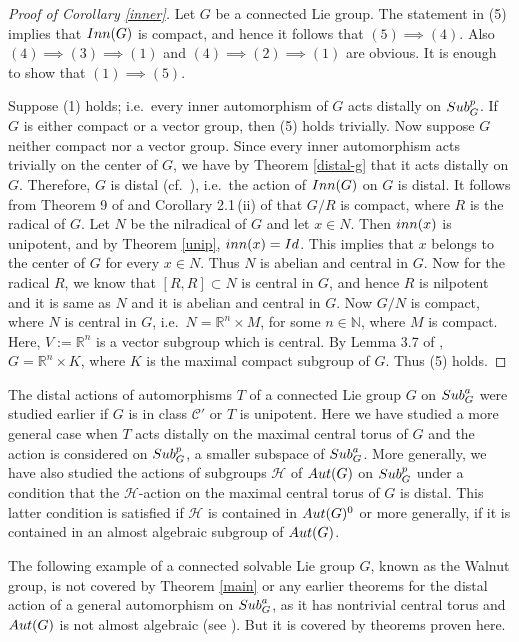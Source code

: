 \documentclass{amsart}
\numberwithin{equation}{section}
\newcommand{\Aut}{{\rm Aut}}
\newcommand{\Sub}{{\rm Sub}}
\newcommand{\N}{{\mathbb N}}
\newcommand{\R}{{\mathbb R}}
\newcommand{\Hc}{{\mathcal H}}
\newcommand{\spg}{{\rm Sub}^p_G}
\newcommand{\Id}{{\rm Id}}
\newcommand{\Inn}{{\rm Inn}}
\newcommand{\inn}{{\rm inn}}
\theoremstyle{remark}
\newcommand{\cp}{{\mathcal{C}'}}
\begin{document}
\begin{proof}[Proof of Corollary \ref{inner}] Let $G$ be a connected Lie group. The statement 
in (5) implies that $\Inn(G)$ is compact, and hence it follows that $(5)\implies (4)$. 
Also $(4)\implies (3)\implies (1)$ and $(4)\implies (2)\implies (1)$ are obvious. 
It is enough to show that $(1)\implies (5)$. 

Suppose (1) holds; i.e.\ every inner automorphism of $G$ acts distally on $\spg$. If $G$ is either compact 
or a vector group, then (5) holds trivially. Now suppose $G$ neither compact nor a vector group. 
Since every inner automorphism acts trivially on the center of $G$, we have by Theorem \ref{distal-g} that 
it acts distally on $G$. Therefore, $G$ is distal (cf.\ \cite{Ro}), i.e.\ the action of $\Inn(G)$ on $G$ is distal. 
It follows from Theorem 9 of \cite{Ro} and Corollary 2.1\,(ii) of \cite{Je} that $G/R$ is compact, where $R$ 
is the radical of $G$. Let $N$ be the nilradical of $G$ and let $x\in N$. Then $\inn(x)$ is unipotent, and 
by Theorem \ref{unip}, $\inn(x)=\Id$. This implies that $x$ belongs to the center of $G$ for every $x\in N$. Thus 
$N$ is abelian and central in $G$. Now for the radical $R$, we know that $[R,R]\subset N$ is central in $G$, 
and hence $R$ is nilpotent and it is same as $N$ and it is abelian and central in $G$. Now $G/N$ is compact,  
where $N$ is central in $G$, i.e.\ $N=\R^n\times M$, for some $n\in\N$, where $M$ is compact. Here, 
$V:=\R^n$ is a vector subgroup which is central. By Lemma 3.7 of \cite{I}, $G=\R^n\times K$, where $K$ 
is the maximal compact subgroup of $G$. Thus (5) holds.
\end{proof}

The distal actions of automorphisms $T$ of a connected Lie group $G$ on $\Sub^a_G$ were studied 
earlier if $G$ is in class $\cp$ or $T$ is unipotent. Here we have studied a more general case when 
$T$ acts distally on the maximal central torus of $G$ and the action is considered on $\spg$, a smaller 
subspace of $\Sub^a_G$. More generally, we have also studied the actions of subgroups $\Hc$ of $\Aut(G)$ 
on $\spg$ under a condition that the $\Hc$-action on the maximal central torus of $G$ is distal. This latter 
condition is satisfied if $\Hc$ is contained in $\Aut(G)^0$ or more generally, if it is contained in an almost 
algebraic subgroup of $\Aut(G)$. 

The following example of a connected solvable Lie group $G$, known as the Walnut group, is not covered 
by Theorem \ref{main} or any earlier theorems for the distal action of a general 
automorphism on $\Sub^a_G$, as it has nontrivial central torus and $\Aut(G)$ is not almost algebraic 
(see \cite{DS2}). But it is covered by theorems proven here.
\end{document}
